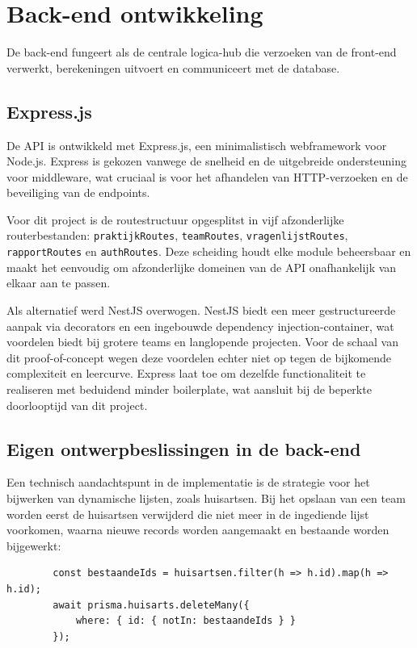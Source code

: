 \section{Back-end ontwikkeling}
\label{sec:backend}

De back-end fungeert als de centrale logica-hub die verzoeken van de front-end verwerkt, berekeningen uitvoert en communiceert met de database.

\subsection{Express.js}
\label{subsec:express}

De API is ontwikkeld met Express.js, een minimalistisch webframework voor Node.js. 
Express is gekozen vanwege de snelheid en de uitgebreide ondersteuning voor middleware, wat cruciaal is voor het afhandelen van HTTP-verzoeken en de beveiliging van de endpoints.
\medskip

Voor dit project is de routestructuur opgesplitst in vijf afzonderlijke routerbestanden: \texttt{praktijkRoutes}, \texttt{teamRoutes}, \texttt{vragenlijstRoutes}, \texttt{rapportRoutes} en \texttt{authRoutes}.
Deze scheiding houdt elke module beheersbaar en maakt het eenvoudig om afzonderlijke domeinen van de API onafhankelijk van elkaar aan te passen.
\medskip

Als alternatief werd NestJS overwogen. NestJS biedt een meer gestructureerde aanpak via decorators en een ingebouwde dependency injection-container, wat voordelen biedt bij grotere teams en langlopende projecten.
Voor de schaal van dit proof-of-concept wegen deze voordelen echter niet op tegen de bijkomende complexiteit en leercurve.
Express laat toe om dezelfde functionaliteit te realiseren met beduidend minder boilerplate, wat aansluit bij de beperkte doorlooptijd van dit project.

\subsection{Eigen ontwerpbeslissingen in de back-end}
\label{subsec:backenddesign}
 
Een technisch aandachtspunt in de implementatie is de strategie voor het bijwerken van dynamische lijsten, zoals huisartsen. 
Bij het opslaan van een team worden eerst de huisartsen verwijderd die niet meer in de ingediende lijst voorkomen, waarna nieuwe records worden aangemaakt en bestaande worden bijgewerkt:

\begin{listing}[H]
    \begin{verbatim}
        const bestaandeIds = huisartsen.filter(h => h.id).map(h => h.id);
        await prisma.huisarts.deleteMany({
            where: { id: { notIn: bestaandeIds } }
        });
    \end{verbatim}
    \caption[Verwijderen huisartsen]{Verwijderen huisartsen}
\end{listing}
 
